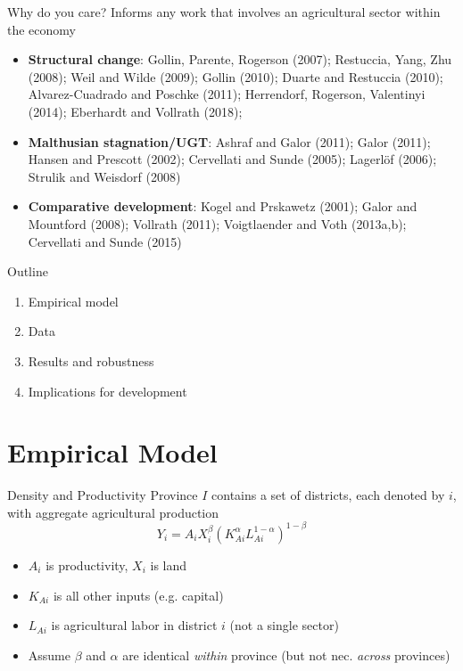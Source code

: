 \documentclass[10pt, xcolor=dvipsnames]{beamer}
\begin{document}
\begin{frame}{Why do you care?}
Informs any work that involves an agricultural sector within the economy

\begin{itemize}
  \item \textbf{Structural change}: Gollin, Parente, Rogerson (2007); Restuccia, Yang, Zhu (2008); Weil and Wilde (2009); Gollin (2010); Duarte and Restuccia (2010); Alvarez-Cuadrado and Poschke (2011); Herrendorf, Rogerson, Valentinyi (2014); Eberhardt and Vollrath (2018); 
  \item \textbf{Malthusian stagnation/UGT}: Ashraf and Galor (2011); Galor (2011); Hansen and Prescott (2002); Cervellati and Sunde (2005); Lagerl{\"o}f (2006); Strulik and Weisdorf (2008)
  \item \textbf{Comparative development}: Kogel and Prskawetz (2001); Galor and Mountford (2008); Vollrath (2011); Voigtlaender and Voth (2013a,b); Cervellati and Sunde (2015)
\end{itemize}

\end{frame}

\begin{frame}{Outline}
\begin{enumerate}
  \item Empirical model
  \item Data
  \item Results and robustness
  \item Implications for development
\end{enumerate}

\end{frame}

\section{Empirical Model}

\begin{frame}{Density and Productivity}
Province $I$ contains a set of districts, each denoted by $i$, with aggregate agricultural production
\begin{equation}
Y_{i} = A_{i} X_{i}^{\beta} \left(K_{Ai}^{\alpha}L_{Ai}^{1-\alpha}\right)^{1-\beta} \label{EQ_production}
\end{equation}
\begin{itemize}
  \item $A_i$ is productivity, $X_i$ is land
  \item $K_{Ai}$ is all other inputs (e.g. capital)
  \item $L_{Ai}$ is agricultural labor in district $i$ (not a single sector)
  \item Assume $\beta$ and $\alpha$ are identical \textit{within} province (but not nec. \textit{across} provinces)
\end{itemize}
\end{frame}
\end{document}
